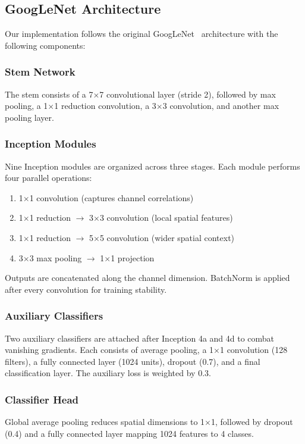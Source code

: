 \documentclass[conference]{IEEEtran}
\begin{document}
\subsection{GoogLeNet Architecture}

Our implementation follows the original GoogLeNet~\cite{szegedy2015going} architecture with the following components:

\subsubsection{Stem Network}
The stem consists of a 7$\times$7 convolutional layer (stride 2), followed by max pooling, a 1$\times$1 reduction convolution, a 3$\times$3 convolution, and another max pooling layer.

\subsubsection{Inception Modules}
Nine Inception modules are organized across three stages. Each module performs four parallel operations:
\begin{enumerate}
    \item 1$\times$1 convolution (captures channel correlations)
    \item 1$\times$1 reduction $\rightarrow$ 3$\times$3 convolution (local spatial features)
    \item 1$\times$1 reduction $\rightarrow$ 5$\times$5 convolution (wider spatial context)
    \item 3$\times$3 max pooling $\rightarrow$ 1$\times$1 projection
\end{enumerate}
Outputs are concatenated along the channel dimension. BatchNorm is applied after every convolution for training stability.

\subsubsection{Auxiliary Classifiers}
Two auxiliary classifiers are attached after Inception 4a and 4d to combat vanishing gradients. Each consists of average pooling, a 1$\times$1 convolution (128 filters), a fully connected layer (1024 units), dropout (0.7), and a final classification layer. The auxiliary loss is weighted by 0.3.

\subsubsection{Classifier Head}
Global average pooling reduces spatial dimensions to 1$\times$1, followed by dropout (0.4) and a fully connected layer mapping 1024 features to 4 classes.
\end{document}
